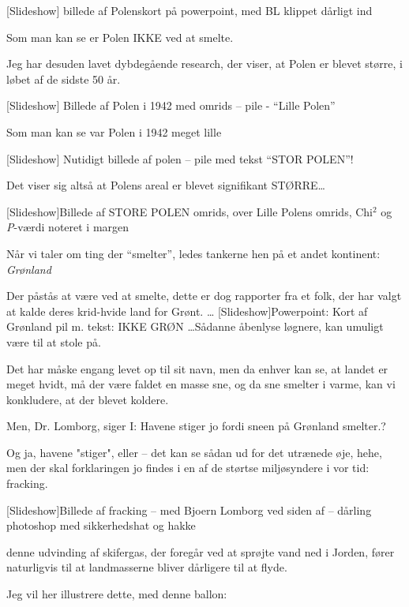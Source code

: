 \documentclass[a4paper,11pt]{article}
\begin{document}
\begin{sketch}
[Slideshow] billede af Polenskort på powerpoint, med BL klippet dårligt ind

 Som man kan se er Polen IKKE ved at smelte.

 Jeg har desuden lavet dybdegående research, der viser, at Polen er blevet større, i løbet af de sidste 50 år.

[Slideshow] Billede af Polen i 1942 med omrids -- pile - ``Lille Polen''

 Som man kan se var Polen i 1942 meget lille

[Slideshow] Nutidigt billede af polen -- pile med tekst ``STOR POLEN''!

 Det viser sig altså at Polens areal er blevet signifikant STØRRE\ldots 

[Slideshow]Billede af STORE POLEN omrids, over Lille Polens omrids, Chi$^{2}$ og \textit{P}-værdi noteret i margen


 Når vi taler om ting der ``smelter'', ledes tankerne hen på et andet kontinent: \emph{Grønland}

 Der påstås at være ved at smelte, dette er dog rapporter fra et folk, der har valgt at kalde deres krid-hvide land for Grønt. \ldots
{}[Slideshow]Powerpoint: Kort af Grønland pil m. tekst: IKKE GRØN
 \ldots Sådanne åbenlyse løgnere, kan umuligt være til at stole på. 

 Det har måske engang levet op til sit navn, men da enhver kan se, at landet er meget hvidt, må der være faldet en masse sne, og da sne smelter i varme, kan vi konkludere, at der blevet koldere. 

 Men, Dr. Lomborg, siger I: Havene stiger jo fordi sneen på Grønland smelter.?

  Og ja, havene "stiger", eller -- det kan se sådan ud for det utrænede øje, hehe, men der skal forklaringen jo findes i en af de størtse miljøsyndere i vor tid: fracking.

[Slideshow]Billede af fracking -- med Bjoern Lomborg ved siden af -- dårling photoshop med sikkerhedshat og hakke

 denne udvinding af skifergas, der foregår ved at sprøjte vand ned i Jorden, fører naturligvis til at landmasserne bliver dårligere til at flyde.

 Jeg vil her illustrere dette, med denne ballon:



\end{sketch}
\end{document}
